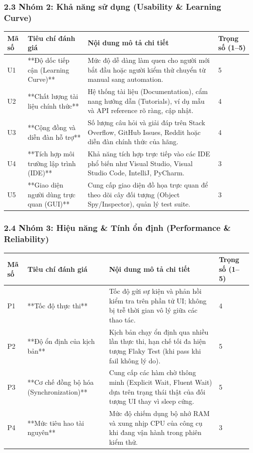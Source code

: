 \subsubsection{2.3 Nhóm 2: Khả năng sử dụng (Usability \& Learning Curve)}

\begin{table}[H]
\centering
\begin{tabular}{|l|l|l|l|}
\hline
\textbf{Mã số} & \textbf{Tiêu chí đánh giá} & \textbf{Nội dung mô tả chi tiết} & \textbf{Trọng số (1–5)} \\ \hline
U1 & **Độ dốc tiếp cận (Learning Curve)** & Mức độ dễ dàng làm quen cho người mới bắt đầu hoặc người kiểm thử chuyển từ manual sang automation. & 5 \\ \hline
U2 & **Chất lượng tài liệu chính thức** & Hệ thống tài liệu (Documentation), cẩm nang hướng dẫn (Tutorials), ví dụ mẫu và API reference rõ ràng, cập nhật. & 4 \\ \hline
U3 & **Cộng đồng và diễn đàn hỗ trợ** & Số lượng câu hỏi và giải đáp trên Stack Overflow, GitHub Issues, Reddit hoặc diễn đàn chính thức của hãng. & 4 \\ \hline
U4 & **Tích hợp môi trường lập trình (IDE)** & Khả năng tích hợp trực tiếp vào các IDE phổ biến như Visual Studio, Visual Studio Code, IntelliJ, PyCharm. & 3 \\ \hline
U5 & **Giao diện người dùng trực quan (GUI)** & Cung cấp giao diện đồ họa trực quan để theo dõi cây đối tượng (Object Spy/Inspector), quản lý test suite. & 3 \\ \hline
\end{tabular}
\end{table}




\subsubsection{2.4 Nhóm 3: Hiệu năng \& Tính ổn định (Performance \& Reliability)}

\begin{table}[H]
\centering
\begin{tabular}{|l|l|l|l|}
\hline
\textbf{Mã số} & \textbf{Tiêu chí đánh giá} & \textbf{Nội dung mô tả chi tiết} & \textbf{Trọng số (1–5)} \\ \hline
P1 & **Tốc độ thực thi** & Tốc độ gửi sự kiện và phản hồi kiểm tra trên phần tử UI; không bị trễ thời gian vô lý giữa các thao tác. & 4 \\ \hline
P2 & **Độ ổn định của kịch bản** & Kịch bản chạy ổn định qua nhiều lần thực thi, hạn chế tối đa hiện tượng Flaky Test (khi pass khi fail không lý do). & 5 \\ \hline
P3 & **Cơ chế đồng bộ hóa (Synchronization)** & Cung cấp các hàm chờ thông minh (Explicit Wait, Fluent Wait) dựa trên trạng thái thật của đối tượng UI thay vì sleep cứng. & 5 \\ \hline
P4 & **Mức tiêu hao tài nguyên** & Mức độ chiếm dụng bộ nhớ RAM và xung nhịp CPU của công cụ khi đang vận hành trong phiên kiểm thử. & 3 \\ \hline
\end{tabular}
\end{table}




